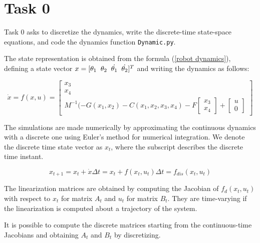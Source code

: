 \chapter*{Task 0}

Task 0 asks to discretize the dynamics, write the discrete-time state-space equations, and code the dynamics function \texttt{Dynamic.py}.

The state representation is obtained from the formula (\ref{robot dynamics}), defining a state vector $x = [\theta_1 \hspace{0.2cm} \theta_2 \hspace{0.2cm}\Dot{\theta_1} \hspace{0.2cm}\Dot{\theta_2} ]^T$ and writing the dynamics as follows:

\begin{equation}
    \Dot{x} = f(x,u) = \begin{bmatrix}
        x_3 \\
        x_4 \\
        M^{-1}( -G(x_1,x_2) -C(x_1,x_2,x_3,x_4) - F\begin{bmatrix}
            x_3\\x_4
        \end{bmatrix} + \begin{bmatrix}
            u \\ 0
        \end{bmatrix}
    \end{bmatrix}
\end{equation}

The simulations are made numerically by approximating the continuous dynamics with a discrete one using Euler's method for numerical integration. We denote the discrete time state vector as $x_t$, where the subscript describes the discrete time instant.

\begin{equation}\label{Discretized traj}
    x_{t+1} = x_t + \Dot{x}\Delta t = x_t + f(x_t,u_t)\Delta t = f_{dis}(x_t,u_t)
\end{equation}

The linearization matrices are obtained by computing the Jacobian of $f_d(x_t,u_t)$ with respect to $x_t$ for matrix $A_t$ and $u_t$ for matrix $B_t$. They are time-varying if the linearization is computed about a trajectory of the system.

It is possible to compute the discrete matrices starting from the continuous-time Jacobians and obtaining $A_t$ and $B_t$ by discretizing.


